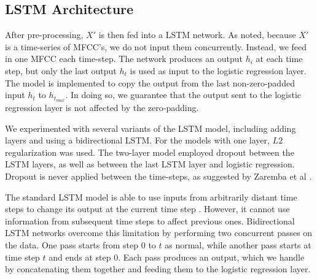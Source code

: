 \documentclass[conference]{IEEEtran}
\begin{document}
\subsection{LSTM Architecture}
After pre-processing, $X'$ is then fed into a LSTM network. As noted, because $X'$ is a time-series of MFCC's, we do not input them concurrently. Instead, we feed in one MFCC each time-step. The network produces an output $h_i$ at each time step, but only the last output $h_t$ is used as input to the logistic regression layer. The model is implemented to copy the output from the last non-zero-padded input $h_t$ to $h_{t_{max}}$. In doing so, we guarantee that the output sent to the logistic regression layer is not affected by the zero-padding.

We experimented with several variants of the LSTM model, including adding layers and using a bidirectional LSTM. For the models with one layer, $L2$ regularization was used. The two-layer model employed dropout \cite{Srivastava:2014:DSW:2627435.2670313} between the LSTM layers, as well as between the last LSTM layer and logistic regression. Dropout is never applied between the time-steps, as suggested by Zaremba et al \cite{DBLP:journals/corr/ZarembaSV14}. 

The standard LSTM model is able to use inputs from arbitrarily distant time steps to change its output at the current time step \cite{gers2002learning}. However, it cannot use information from subsequent time steps to affect previous ones. Bidirectional LSTM networks overcome this limitation by performing two concurrent passes on the data. One pass starts from step $0$ to $t$ as normal, while another pass starts at time step $t$ and ends at step $0$. Each pass produces an output, which we handle by concatenating them together and feeding them to the logistic regression layer.
\end{document}
